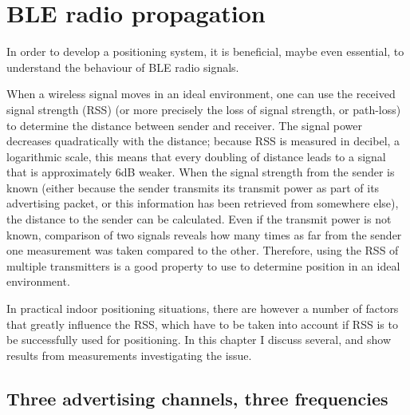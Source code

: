 \chapter{BLE radio propagation}
\label{chap:rss}
\newcommand{\packetlosscell}[1]{& \footnotesize{#1}}



In order to develop a \BLE positioning system, it is beneficial, maybe even essential, to understand the behaviour of BLE radio signals.

When a wireless signal moves in an ideal environment, one can use the received signal strength (RSS) (or more precisely the loss of signal strength, or path-loss) to determine the distance between sender and receiver.
The signal power decreases quadratically with the distance; because RSS is measured in decibel, a logarithmic scale, this means that every doubling of distance leads to a signal that is approximately 6dB weaker.
When the signal strength from the sender is known (either because the sender transmits its transmit power as part of its advertising packet, or this information has been retrieved from somewhere else), the distance to the sender can be calculated.
Even if the transmit power is not known, comparison of two signals reveals how many times as far from the sender one measurement was taken compared to the other.
Therefore, using the RSS of multiple transmitters is a good property to use to determine position in an ideal environment.

In practical indoor positioning situations, there are however a number of factors that greatly influence the RSS, which have to be taken into account if RSS is to be successfully used for positioning.
In this chapter I discuss several, and show results from measurements investigating the issue.

\section{Three advertising channels, three frequencies}




